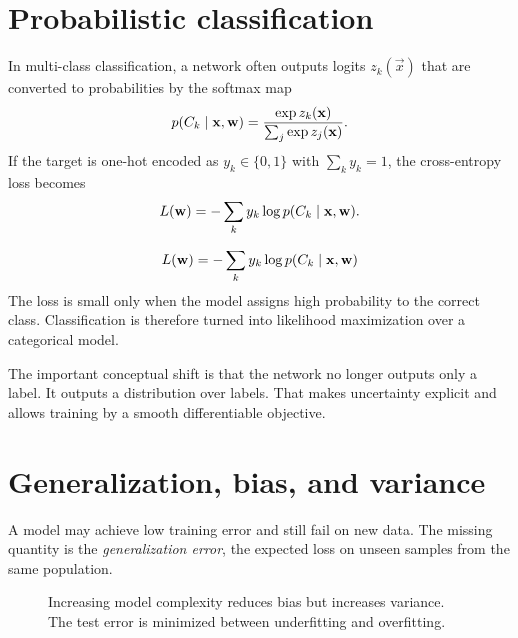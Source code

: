 \section{Probabilistic classification}

In multi-class classification, a network often outputs logits $z_k(\vec{x})$ that are converted to probabilities by the softmax map
\[
  p(C_k \mid \mathbf{x}, \mathbf{w})
  =
  \frac{\exp z_k(\mathbf{x})}{\sum_j \exp z_j(\mathbf{x})}.
\]
If the target is one-hot encoded as $y_k \in \{0,1\}$ with $\sum_k y_k = 1$, the cross-entropy loss becomes
\[
  L(\mathbf{w})
  =
  -\sum_k y_k \log p(C_k \mid \mathbf{x}, \mathbf{w}).
\]

\begin{keyequation}
\[
L(\mathbf{w})
=
-\sum_k y_k \log p(C_k \mid \mathbf{x}, \mathbf{w})
\]
\tcblower
The loss is small only when the model assigns high probability to the correct class. Classification is therefore turned into likelihood maximization over a categorical model.
\end{keyequation}

The important conceptual shift is that the network no longer outputs only a label. It outputs a distribution over labels. That makes uncertainty explicit and allows training by a smooth differentiable objective.

\section{Generalization, bias, and variance}

A model may achieve low training error and still fail on new data. The missing quantity is the \emph{generalization error}, the expected loss on unseen samples from the same population.

\begin{figure}[t]
\centering
{}
\caption{Increasing model complexity reduces bias but increases variance. The test error is minimized between underfitting and overfitting.}
\end{figure}

